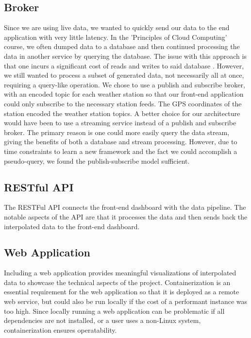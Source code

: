 \subsection{Broker}
Since we are using live data, we wanted to quickly send our data to the end application with very little latency. 
In the 'Principles of Cloud Computing' course, we often dumped data to a database and then continued processing the data in another service by querying the database.
The issue with this approach is that one incurs a significant cost of reads and writes to said database \cite{stonebraker20058}.
However, we still wanted to process a subset of generated data, not necessarily all at once, requiring a query-like operation.
We chose to use a publish and subscribe broker,
with an encoded topic for each weather station so that our front-end application could only subscribe to the necessary station feeds. 
The GPS coordinates of the station encoded the weather station topics.
A better choice for our architecture would have been to use a streaming service instead of a publish and subscribe broker. 
The primary reason is one could more easily query the data stream, giving the benefits of both a database and stream processing.
However, due to time constraints to learn a new framework and the fact we could accomplish a pseudo-query, we found the publish-subscribe model sufficient. 

\subsection{RESTful API}
The RESTFul API connects the front-end dashboard with the data pipeline. 
The notable aspects of the API are that it processes the data and then sends back the interpolated data to the front-end dashboard. 

\subsection{Web Application}
Including a web application provides meaningful visualizations of interpolated data to showcase the technical aspects of the project. 
Containerization is an essential requirement for the web application so that it is deployed as a remote web service,
but could also be run locally if the cost of a performant instance was too high. 
Since locally running a web application can be problematic if all dependencies are not installed,
or a user uses a non-Linux system,
containerization ensures operatability. 

